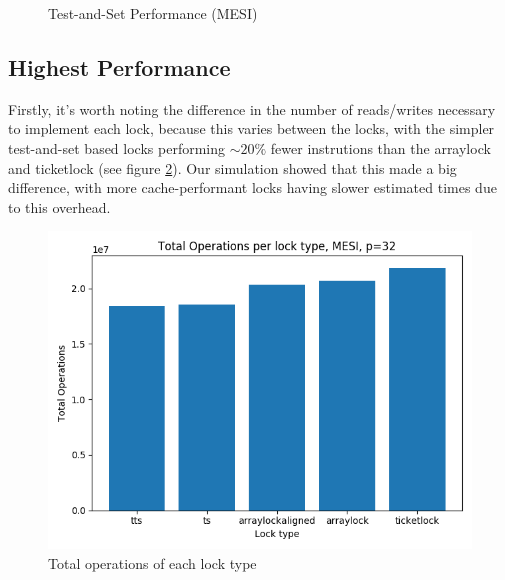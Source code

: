 \documentclass{article}
\begin{document}
\begin{figure}[h]%
    \centering
    \qquad
    \caption{Test-and-Set Performance (MESI)}
    \label{fig:tsbad}
\end{figure}

\subsection{Highest Performance}
Firstly, it's worth noting the difference in the number of reads/writes necessary to implement each lock, because this varies between the locks, with the simpler test-and-set based locks performing $\sim20\%$ fewer instrutions than the arraylock and ticketlock (see figure \ref{fig:ops}). Our simulation showed that this made a big difference, with more cache-performant locks having slower estimated times due to this overhead.

\begin{figure}[h]
\centering
\includegraphics[width=.5\textwidth]{figures/ops.png}
\caption{Total operations of each lock type}
\label{fig:ops}
\end{figure}
\end{document}
